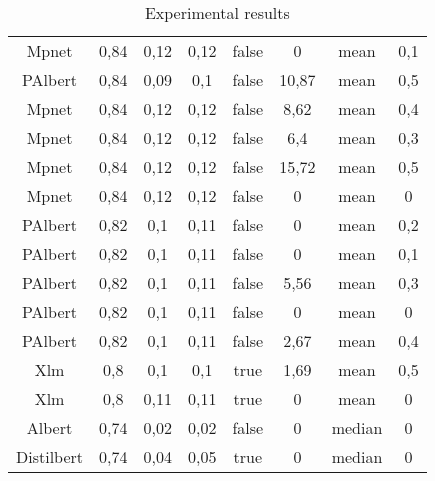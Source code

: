 \documentclass[\main/main.tex]{subfiles}
\begin{document}
\begin{table}[H]
{\begin{tabular}{||c|c|c|c|c|c|c|c||}
Mpnet                 & 0,84 & 0,12  & 0,12  & false & 0     & mean   & 0,1 \\
\rowcolor{gray} PAlbert          & 0,84 & 0,09  & 0,1   & false & 10,87 & mean   & 0,5 \\
Mpnet                 & 0,84 & 0,12  & 0,12  & false & 8,62  & mean   & 0,4 \\
Mpnet                 & 0,84 & 0,12  & 0,12  & false & 6,4   & mean   & 0,3 \\
\rowcolor{gray} Mpnet                 & 0,84 & 0,12  & 0,12  & false & 15,72 & mean   & 0,5 \\
Mpnet                 & 0,84 & 0,12  & 0,12  & false & 0     & mean   & 0   \\
PAlbert          & 0,82 & 0,1   & 0,11  & false & 0     & mean   & 0,2 \\
PAlbert          & 0,82 & 0,1   & 0,11  & false & 0     & mean   & 0,1 \\
PAlbert          & 0,82 & 0,1   & 0,11  & false & 5,56  & mean   & 0,3 \\
PAlbert          & 0,82 & 0,1   & 0,11  & false & 0     & mean   & 0   \\
PAlbert          & 0,82 & 0,1   & 0,11  & false & 2,67  & mean   & 0,4 \\
Xlm    & 0,8  & 0,1   & 0,1   & true  & 1,69  & mean   & 0,5 \\
Xlm    & 0,8  & 0,11  & 0,11  & true  & 0     & mean   & 0   \\
Albert                    & 0,74 & 0,02  & 0,02  & false & 0     & median & 0   \\
Distilbert & 0,74 & 0,04  & 0,05  & true  & 0     & median & 0   \\
\hline
\end{tabular}
}
\caption{Experimental results}
\label{tab:experimental_results_complete}
\end{table}
\end{document}
